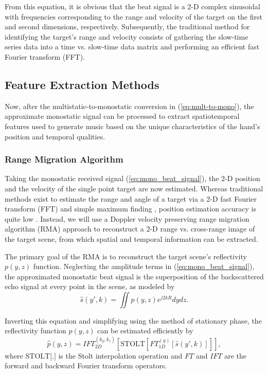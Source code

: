 \documentclass[10pt,journal,final]{IEEEtran}
\begin{document}
From this equation, it is obvious that the beat signal is a 2-D complex sinusoidal with frequencies corresponding to the range and velocity of the target on the first and second dimensions, respectively. Subsequently, the traditional method for identifying the target's range and velocity consists of gathering the slow-time series data into a time vs. slow-time data matrix and performing an efficient fast Fourier transform (FFT).

\subsection{Feature Extraction Methods}
\label{subsec:feature_extraction_methods}
Now, after the multistatic-to-monostatic conversion in (\ref{eq:mult-to-mono}), the approximate monostatic signal can be processed to extract spatiotemporal features used to generate music based on the unique characteristics of the hand's position and temporal qualities.

\subsubsection{Range Migration Algorithm}
\label{subsubsec:rma}
Taking the monostatic received signal (\ref{eq:mono_beat_signal}), the 2-D position and the velocity of the single point target are now estimated. Whereas traditional methods exist to estimate the range and angle of a target via a 2-D fast Fourier transform (FFT) and simple maximum finding \cite{ti:intro_to_FMCW_radars}, position estimation accuracy is quite low \cite{mimo:joint_range_angle_estimation}. Instead, we will use a Doppler velocity preserving range migration algorithm (RMA) approach to reconstruct a 2-D range vs. cross-range image of the target scene, from which spatial and temporal information can be extracted.

The primary goal of the RMA is to reconstruct the target scene's reflectivity $p(y,z)$ function. Neglecting the amplitude terms in (\ref{eq:mono_beat_signal}), the approximated monostatic beat signal is the superposition of the backscattered echo signal at every point in the scene, as modeled by
\begin{equation}
	\label{eq:rma_1}
	\hat{s}(y',k) = \iint p(y,z) e^{j2kR}dydz.
\end{equation}

Inverting this equation and simplifying using the method of stationary phase, the reflectivity function $p(y,z)$ can be estimated efficiently by
\begin{equation}
	\label{eq:rma_summary}
	\hat{p}(y,z) = IFT_{2D}^{(k_y,k_z)}\left[ \text{STOLT}\left[ FT_{1D}^{(y)}[\hat{s}(y',k)] \right] \right],
\end{equation}
where $\text{STOLT[.]}$ is the Stolt interpolation operation and $FT$ and $IFT$ are the forward and backward Fourier transform operators.
\end{document}
